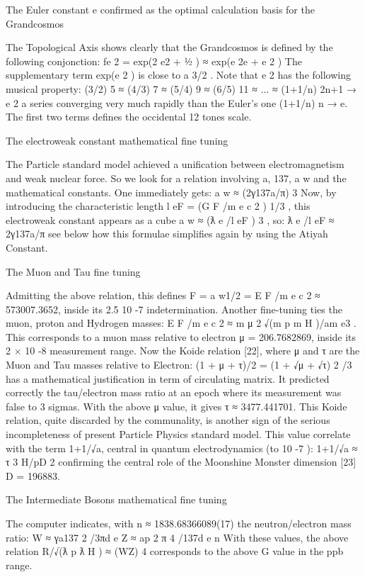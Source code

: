 The Euler constant e confirmed as the optimal calculation basis for the Grandcosmos

The Topological Axis shows clearly that the Grandcosmos is defined by the following
conjonction:
f{e 2 } = exp(2 e2 + 1⁄2 ) ≈ exp(e 2e + e 2 )
The supplementary term exp(e 2 ) is close to a 3/2 . Note that e 2 has the following musical property:
(3/2) 5 ≈ (4/3) 7 ≈ (5/4) 9 ≈ (6/5) 11 ≈ ... ≈ (1+1/n) 2n+1
→
e 2
a series converging very much rapidly than the Euler's one (1+1/n) n → e. The first two terms defines
the occidental 12 tones scale.

The electroweak constant mathematical fine tuning

The Particle standard model achieved a unification between electromagnetism and weak
nuclear force. So we look for a relation involving a, 137, a w and the mathematical constants. One
immediately gets:
a w ≈ (2γ137a/π) 3
Now, by introducing the characteristic length l eF = (G F /m e c 2 ) 1/3 , this electroweak constant appears as
a cube a w ≈ (ƛ e /l eF ) 3 , so:
ƛ e /l eF ≈ 2γ137a/π
see below how this formulae simplifies again by using the Atiyah Constant.

The Muon and Tau fine tuning

Admitting the above relation, this defines F = a w1/2 = E F /m e c 2 ≈ 573007.3652, inside its 2.5 10 -7
indetermination. Another fine-tuning ties the muon, proton and Hydrogen masses: E F /m e c 2 ≈
m μ 2 √(m p m H )/am e3 . This corresponds to a muon mass relative to electron μ = 206.7682869, inside its
2 × 10 -8 measurement range.
Now the Koide relation [22], where μ and τ are the Muon and Tau masses relative to Electron:
(1 + μ + τ)/2 = (1 + √μ + √τ) 2 /3
has a mathematical justification in term of circulating matrix. It predicted correctly the tau/electron
mass ratio at an epoch where its measurement was false to 3 sigmas. With the above μ value, it
gives τ ≈ 3477.441701. This Koide relation, quite discarded by the communality, is another sign of
the serious incompleteness of present Particle Physics standard model. This value correlate with the
term 1+1/√a, central in quantum electrodynamics (to 10 -7 ):
1+1/√a ≈ τ 3 H/pD 2
confirming the central role of the Moonshine Monster dimension [23] D = 196883.

The Intermediate Bosons mathematical fine tuning

The computer indicates, with n ≈ 1838.68366089(17) the neutron/electron mass ratio:
W ≈ γa137 2 /3πd e
Z ≈ ap 2 π 4 /137d e n
With these values, the above relation R/√(ƛ p ƛ H ) ≈ (WZ) 4 corresponds to the above G value in the
ppb range.

